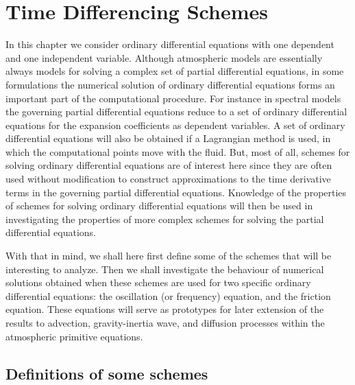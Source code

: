

\chapter{Time Differencing Schemes}\label{ch:time-differencing-schemes}

In this chapter we consider ordinary differential equations with one
dependent and one independent variable. Although atmospheric models are
essentially always models for solving a complex set of partial
differential equations, in some formulations the numerical solution of
ordinary differential equations forms an important part of the
computational procedure. For instance in spectral models the governing
partial differential equations reduce to a set of ordinary differential
equations for the expansion coefficients as dependent variables. A set
of ordinary differential equations will also be obtained if a Lagrangian
method is used, in which the computational points move with the fluid.
But, most of all, schemes for solving ordinary differential equations
are of interest here since they are often used without modification to
construct approximations to the time derivative terms in the governing
partial differential equations. Knowledge of the properties of schemes
for solving ordinary differential equations will then be used in
investigating the properties of more complex schemes for solving the
partial differential equations.

With that in mind, we shall here first define some of the schemes that
will be interesting to analyze. Then we shall investigate the behaviour
of numerical solutions obtained when these schemes are used for two
specific ordinary differential equations: the oscillation (or frequency)
equation, and the friction equation. These equations will serve as
prototypes for later extension of the results to advection,
gravity-inertia wave, and diffusion processes within the atmospheric
primitive equations.

\section{Definitions of some schemes}\label{sec:def-some-schemes}

